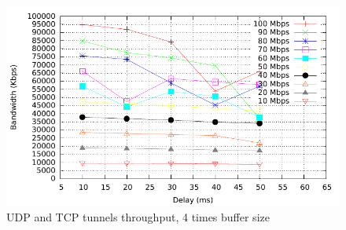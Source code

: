 \begin{figure}
  \centering
  \includegraphics[width=\textwidth]{img/test-mptcp-4}
  \caption{UDP and TCP tunnels throughput, 4 times buffer size}
  \label{fig:mptcp-4}
\end{figure}

